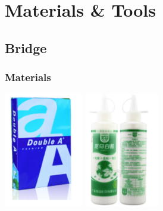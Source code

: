 \section{Materials \& Tools}
\subsection{Bridge}
\subsubsection{Materials}


\newcommand{\beginMyTabular}{
    \begin{center}
    \begin{tabular}{p{0.4cm}p{5cm}p{7cm}rr}
    \hline
    No. & Item & Specification & Quantity & Price(Yuan) \\
    \hline
}
\newcommand{\MyTabularEnd}{
    \end{tabular}
    \end{center}
}

\setcounter{matcnt}{0}
\newcommand{\CounterOfM}{\stepcounter{matcnt}\arabic{matcnt}}
%

\begin{center}
\includegraphics[height=5cm]{picture/material/a4paper}
\includegraphics[height=5cm]{picture/material/whiteglue}
\end{center}

